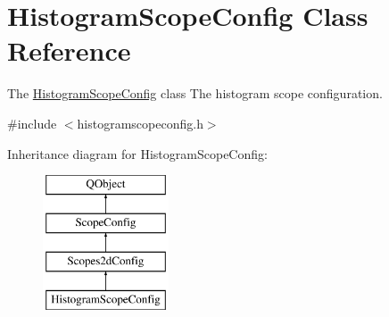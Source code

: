 \hypertarget{class_histogram_scope_config}{\section{Histogram\-Scope\-Config Class Reference}
\label{class_histogram_scope_config}
}


The \hyperlink{class_histogram_scope_config}{Histogram\-Scope\-Config} class The histogram scope configuration.  




{\ttfamily \#include $<$histogramscopeconfig.\-h$>$}

Inheritance diagram for Histogram\-Scope\-Config\-:\begin{figure}[H]
\begin{center}
\leavevmode
\includegraphics[height=4.000000cm]{class_histogram_scope_config}
\end{center}
\end{figure}
